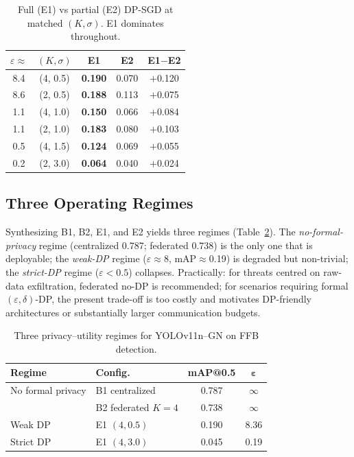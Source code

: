 \documentclass[twocolumn,a4paper,10pt]{article}
\begin{document}
\begin{table}[ht]
\centering
\caption{Full (E1) vs partial (E2) DP-SGD at matched $(K,\sigma)$. E1 dominates
throughout.}
\label{tab:e1vse2}
\small
\setlength{\tabcolsep}{4pt}
\begin{tabular}{ccccc}
\toprule
$\varepsilon\!\approx$ & $(K,\sigma)$ & E1 & E2 & E1$-$E2 \\
\midrule
8.4  & (4, 0.5) & \textbf{0.190} & 0.070 & $+$0.120 \\
8.6  & (2, 0.5) & \textbf{0.188} & 0.113 & $+$0.075 \\
1.1  & (4, 1.0) & \textbf{0.150} & 0.066 & $+$0.084 \\
1.1  & (2, 1.0) & \textbf{0.183} & 0.080 & $+$0.103 \\
0.5  & (4, 1.5) & \textbf{0.124} & 0.069 & $+$0.055 \\
0.2  & (2, 3.0) & \textbf{0.064} & 0.040 & $+$0.024 \\
\bottomrule
\end{tabular}
\end{table}

\subsection{Three Operating Regimes}
Synthesizing B1, B2, E1, and E2 yields three regimes (Table~\ref{tab:regime}).
The \emph{no-formal-privacy} regime (centralized 0.787; federated 0.738) is the
only one that is deployable; the \emph{weak-DP} regime ($\varepsilon\approx 8$,
mAP$\approx$0.19) is degraded but non-trivial; the \emph{strict-DP} regime
($\varepsilon < 0.5$) collapses. Practically: for threats centred on raw-data
exfiltration, federated no-DP is recommended; for scenarios requiring formal
$(\varepsilon,\delta)$-DP, the present trade-off is too costly and motivates
DP-friendly architectures or substantially larger communication budgets.

\begin{table}[ht]
\centering
\caption{Three privacy--utility regimes for YOLOv11n--GN on FFB detection.}
\label{tab:regime}
\small
\setlength{\tabcolsep}{3.5pt}
\begin{tabular}{llcc}
\toprule
\textbf{Regime} & \textbf{Config.} & \textbf{mAP@0.5} & $\boldsymbol{\varepsilon}$ \\
\midrule
No formal privacy & B1 centralized      & 0.787 & $\infty$ \\
                  & B2 federated $K{=}4$ & 0.738 & $\infty$ \\
Weak DP           & E1 $(4,0.5)$        & 0.190 & 8.36 \\
Strict DP         & E1 $(4,3.0)$        & 0.045 & 0.19 \\
\bottomrule
\end{tabular}
\end{table}
\end{document}
